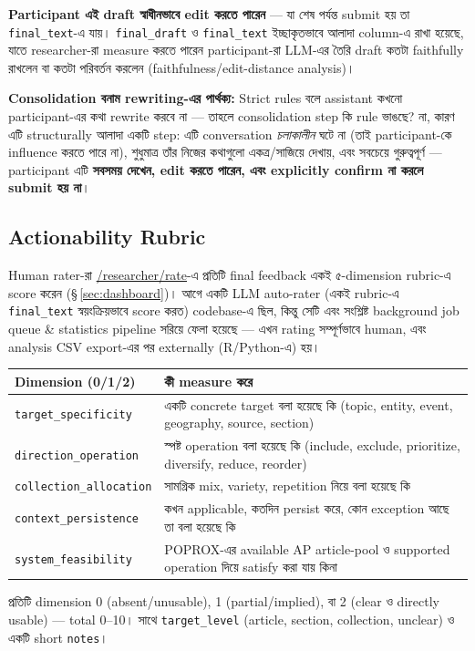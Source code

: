 \documentclass[11pt,a4paper]{article}
\newcommand{\code}[1]{\texttt{\small #1}}
\newcommand{\pathcode}[1]{{\small\url{#1}}}
\begin{document}
\textbf{Participant এই draft স্বাধীনভাবে edit করতে পারেন} --- যা শেষ পর্যন্ত submit হয় তা
\code{final\_text}-এ যায়। \code{final\_draft} ও \code{final\_text} ইচ্ছাকৃতভাবে আলাদা column-এ
রাখা হয়েছে, যাতে researcher-রা measure করতে পারেন participant-রা LLM-এর তৈরি draft কতটা
faithfully রাখলেন বা কতটা পরিবর্তন করলেন (faithfulness/edit-distance analysis)।

\textbf{Consolidation বনাম rewriting-এর পার্থক্য:} Strict rules বলে assistant কখনো
participant-এর কথা rewrite করবে না --- তাহলে consolidation step কি rule ভাঙছে? না, কারণ এটি
structurally আলাদা একটি step: এটি conversation \textit{চলাকালীন} ঘটে না (তাই participant-কে
influence করতে পারে না), শুধুমাত্র তাঁর নিজের কথাগুলো একত্র/সাজিয়ে দেখায়, এবং সবচেয়ে
গুরুত্বপূর্ণ --- participant এটি \textbf{সবসময় দেখেন, edit করতে পারেন, এবং explicitly
confirm না করলে submit হয় না}।

\subsection{Actionability Rubric}
\label{sec:rubric}
Human rater-রা \pathcode{/researcher/rate}-এ প্রতিটি final feedback একই ৫-dimension rubric-এ
score করেন (\S\,\ref{sec:dashboard})। আগে একটি LLM auto-rater (একই rubric-এ
\code{final\_text} স্বয়ংক্রিয়ভাবে score করত) codebase-এ ছিল, কিন্তু সেটি এবং সংশ্লিষ্ট
background job queue \& statistics pipeline সরিয়ে ফেলা হয়েছে --- এখন rating সম্পূর্ণভাবে
human, এবং analysis CSV export-এর পর externally (R/Python-এ) হয়।

\begin{longtable}{@{}p{3.9cm}p{11.3cm}@{}}
\toprule
\textbf{Dimension (0/1/2)} & \textbf{কী measure করে} \\
\midrule
\endhead
\code{target\_specificity} & একটি concrete target বলা হয়েছে কি (topic, entity, event,
  geography, source, section) \\
\code{direction\_operation} & স্পষ্ট operation বলা হয়েছে কি (include, exclude, prioritize,
  diversify, reduce, reorder) \\
\code{collection\_allocation} & সামগ্রিক mix, variety, repetition নিয়ে বলা হয়েছে কি \\
\code{context\_persistence} & কখন applicable, কতদিন persist করে, কোন exception আছে তা বলা
  হয়েছে কি \\
\code{system\_feasibility} & POPROX-এর available AP article-pool ও supported operation দিয়ে
  satisfy করা যায় কিনা \\
\bottomrule
\end{longtable}
প্রতিটি dimension 0 (absent/unusable), 1 (partial/implied), বা 2 (clear ও directly usable)
--- total 0--10। সাথে \code{target\_level} (article, section, collection, unclear) ও একটি
short \code{notes}।
\end{document}
